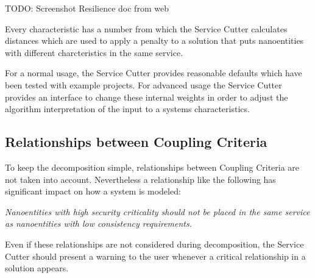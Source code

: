 TODO: Screenshot Resilience doc from web

Every characteristic has a number from which the Service Cutter calculates distances which are used to apply a penalty to a solution that puts nanoentities with different charcteristics in the same service. 

For a normal usage, the Service Cutter provides reasonable defaults which have been tested with example projects. For advanced usage the Service Cutter provides an interface to change these internal weights in order to adjust the algorithm interpretation of the input to a systems characteristics. 

\subsection{Relationships between Coupling Criteria}

To keep the decomposition simple, relationships between Coupling Criteria are not taken into account. Nevertheless a relationship like the following has significant impact on how a system is modeled:

\textit{Nanoentities with high security criticality should not be placed in the same service as nanoentities with low consistency requirements.}

Even if these relationships are not considered during decomposition, the Service Cutter should present a warning to the user whenever a critical relationship in a solution appears.
